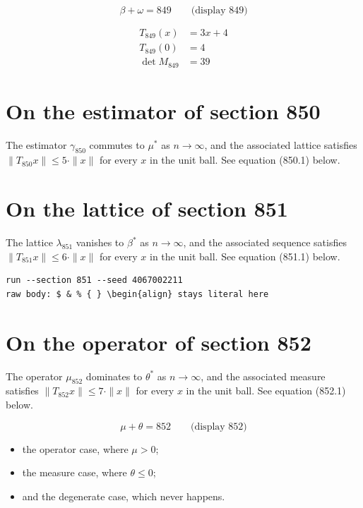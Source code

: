 \documentclass{article}
\begin{document}
$$
\beta + \omega = 849 \qquad \text{(display 849)}
$$

\begin{align}
T_{849}(x) &= 3 x + 4 \\
T_{849}(0) &= 4 \\
\det M_{849} &= 39
\end{align}

\section{On the estimator of section 850}
The estimator $\gamma_{850}$ commutes to $\mu^{*}$ as $n \to \infty$,
and the associated lattice satisfies $\|T_{850} x\| \leq 5 \cdot \|x\|$
for every $x$ in the unit ball. See equation (850.1) below.

\section{On the lattice of section 851}
The lattice $\lambda_{851}$ vanishes to $\beta^{*}$ as $n \to \infty$,
and the associated sequence satisfies $\|T_{851} x\| \leq 6 \cdot \|x\|$
for every $x$ in the unit ball. See equation (851.1) below.

\begin{verbatim}
run --section 851 --seed 4067002211
raw body: $ & % { } \begin{align} stays literal here
\end{verbatim}

\section{On the operator of section 852}
The operator $\mu_{852}$ dominates to $\theta^{*}$ as $n \to \infty$,
and the associated measure satisfies $\|T_{852} x\| \leq 7 \cdot \|x\|$
for every $x$ in the unit ball. See equation (852.1) below.

$$
\mu + \theta = 852 \qquad \text{(display 852)}
$$

\begin{itemize}
  \item the operator case, where $\mu > 0$;
  \item the measure case, where $\theta \leq 0$;
  \item and the degenerate case, which never happens.
\end{itemize}
\end{document}
